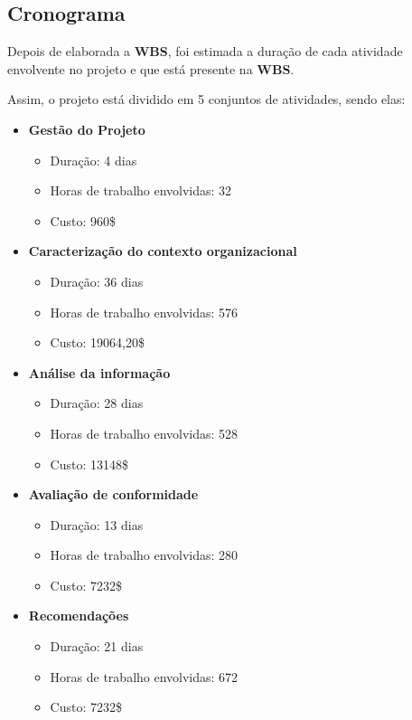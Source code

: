 \subsection{Cronograma}

Depois de elaborada a \textbf{WBS}, foi estimada a duração de cada atividade envolvente no projeto e que está presente na \textbf{WBS}.

Assim, o projeto está dividido em 5 conjuntos de atividades, sendo elas:

\begin{itemize}
	\item \textbf{Gestão do Projeto}
		\begin{itemize}
			\item Duração: 4 dias
			\item Horas de trabalho envolvidas: 32
			\item Custo: 960\$
		\end{itemize}
	\item \textbf{Caracterização do contexto organizacional}
		\begin{itemize}
			\item Duração: 36 dias
			\item Horas de trabalho envolvidas: 576
			\item Custo: 19064,20\$
		\end{itemize}
	\item \textbf{Análise da informação}
		\begin{itemize}
			\item Duração: 28 dias
			\item Horas de trabalho envolvidas: 528
			\item Custo: 13148\$
		\end{itemize}
	\item \textbf{Avaliação de conformidade}
		\begin{itemize}
			\item Duração: 13 dias
			\item Horas de trabalho envolvidas: 280
			\item Custo: 7232\$
    \end{itemize}
    \item \textbf{Recomendações}
		\begin{itemize}
      \item Duração: 21 dias
      \item Horas de trabalho envolvidas: 672
			\item Custo: 7232\$
		\end{itemize}
\end{itemize}
